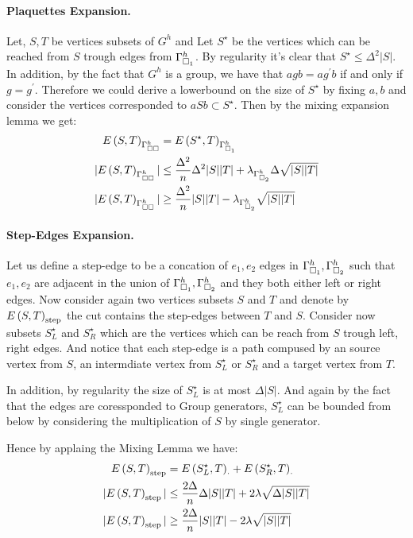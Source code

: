 \documentclass{article}
\begin{document}
\begin{multicols*}{2}
	\paragraph{Plaquettes Expansion.} Let, $S , T$ be vertices subsets of $G^{h}$ and Let $S^{\star}$ be the vertices which can be reached from $S$ trough edges from $\Gamma_{\square_{1}}^{h}$. By regularity it's clear that $S^{\star}\le \Delta^{2}|S|$. In addition, by the fact that $G^{h}$ is a group, we have that $agb = ag^{\prime}b$ if and only if $g = g^{\prime}$. 
	Therefore we could derive a lowerbound on the size of $S^{\star}$ by fixing $a,b$ and consider the vertices corresponded to $aSb \subset S^{\star}$.    
	Then by the mixing expansion lemma we get: 
	\begin{equation*}
	  \begin{split}
	  E\left( S,T \right)_{\Gamma_{\square \square }^{h}} &= E\left( S^{\star}, T  \right)_{\Gamma_{\square_{1}}^{h}} \\
	|E\left( S,T \right)_{\Gamma_{\square \square }^{h}}| &\le \frac{\Delta^{2}}{n}\Delta^{2}|S||T| + \lambda_{\Gamma_{\square_{2}}^{h}}\Delta\sqrt{|S||T|} \\ 
      |E\left( S,T \right)_{\Gamma_{\square \square }^{h}}| &\ge \frac{\Delta^{2}}{n}|S||T| - \lambda_{\Gamma_{\square_{2}}^{h}}\sqrt{|S||T|}  
	  \end{split}
	\end{equation*}
	\paragraph{Step-Edges Expansion.} Let us define a step-edge to be a concation of $e_{1},e_{2}$ edges in $\Gamma_{\square_{1}}^{h}, \Gamma_{\square_{2}}^{h}$ such that $e_{1},e_{2}$ are adjacent in the union of $\Gamma_{\square_{1}}^{h}, \Gamma_{\square_{2}}^{h}$ and they both either left or right edges. 
	Now consider again two vertices subsets $S$ and $T$ and denote by $ E\left( S,T \right)_{\text{step}} $ the cut contains the step-edges between $T$ and $S$.
	Consider now subsets $S^{\star}_{L}$ and $S^{\star}_{R}$ which are the vertices which can be reach from $S$ trough left, right edges. And notice that each step-edge is a path compused by an source vertex from $S$, an intermdiate vertex from $S^{\star}_{L}$ or $S^{\star}_{R}$ and a target vertex from $T$. 

	In addition, by regularity the size of $S^{\star}_{L}$ is at most $\Delta|S|$.
	And again by the fact that the edges are coressponded to Group generators, $S^{\star}_{L}$ can be bounded from below by considering the multiplication of $S$ by single generator.    
	

	Hence by applaing the Mixing Lemma we have: 
		\begin{equation*}
	  \begin{split}
	    E\left( S,T \right)_{\text{step}} &= E\left( S^{\star}_{L}, T  \right)_{\cdot} +  E\left( S^{\star}_{R}, T  \right)_{\cdot} \\
	|E\left( S,T \right)_{\text{step}}| &\le \frac{2\Delta}{n}\Delta|S||T| + 2\lambda\sqrt{\Delta|S||T|} \\ 
      |E\left( S,T \right)_{\text{step}}| &\ge \frac{2\Delta}{n}|S||T| - 2\lambda\sqrt{|S||T|}  
	  \end{split}
	\end{equation*}




\end{multicols*}
\end{document}
